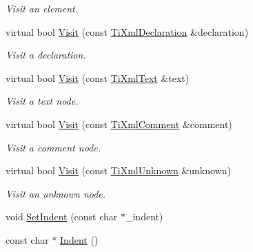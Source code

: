 \begin{DoxyCompactItemize}
\begin{DoxyCompactList}\small\item\em \-Visit an element. \end{DoxyCompactList}\item 
\hypertarget{class_ti_xml_printer_adaf7eec4dc43ad071ff52b60361574f5}{
virtual bool \hyperlink{class_ti_xml_printer_adaf7eec4dc43ad071ff52b60361574f5}{\-Visit} (const \hyperlink{class_ti_xml_declaration}{\-Ti\-Xml\-Declaration} \&declaration)}
\label{class_ti_xml_printer_adaf7eec4dc43ad071ff52b60361574f5}

\begin{DoxyCompactList}\small\item\em \-Visit a declaration. \end{DoxyCompactList}\item 
\hypertarget{class_ti_xml_printer_a0857c5d32c59b9a257f9a49cb9411df5}{
virtual bool \hyperlink{class_ti_xml_printer_a0857c5d32c59b9a257f9a49cb9411df5}{\-Visit} (const \hyperlink{class_ti_xml_text}{\-Ti\-Xml\-Text} \&text)}
\label{class_ti_xml_printer_a0857c5d32c59b9a257f9a49cb9411df5}

\begin{DoxyCompactList}\small\item\em \-Visit a text node. \end{DoxyCompactList}\item 
\hypertarget{class_ti_xml_printer_a9870423f5603630e6142f6bdb66dfb57}{
virtual bool \hyperlink{class_ti_xml_printer_a9870423f5603630e6142f6bdb66dfb57}{\-Visit} (const \hyperlink{class_ti_xml_comment}{\-Ti\-Xml\-Comment} \&comment)}
\label{class_ti_xml_printer_a9870423f5603630e6142f6bdb66dfb57}

\begin{DoxyCompactList}\small\item\em \-Visit a comment node. \end{DoxyCompactList}\item 
\hypertarget{class_ti_xml_printer_a08591a15c9a07afa83c24e08b03d6358}{
virtual bool \hyperlink{class_ti_xml_printer_a08591a15c9a07afa83c24e08b03d6358}{\-Visit} (const \hyperlink{class_ti_xml_unknown}{\-Ti\-Xml\-Unknown} \&unknown)}
\label{class_ti_xml_printer_a08591a15c9a07afa83c24e08b03d6358}

\begin{DoxyCompactList}\small\item\em \-Visit an unknown node. \end{DoxyCompactList}\item 
void \hyperlink{class_ti_xml_printer_a213377a4070c7e625bae59716b089e5e}{\-Set\-Indent} (const char $\ast$\-\_\-indent)
\item 
\hypertarget{class_ti_xml_printer_abb33ec7d4bad6aaeb57f4304394b133d}{
const char $\ast$ \hyperlink{class_ti_xml_printer_abb33ec7d4bad6aaeb57f4304394b133d}{\-Indent} ()}
\label{class_ti_xml_printer_abb33ec7d4bad6aaeb57f4304394b133d}


\end{DoxyCompactItemize}
